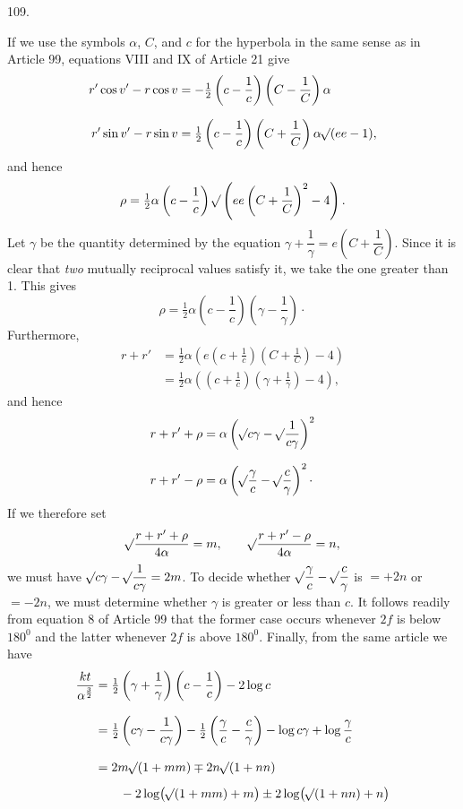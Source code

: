 \par{}\medskip
\hypertarget{native-151-article109}{}
\begin{center}109.\end{center}
If we use the symbols $\alpha$, $C$, and $c$ for the hyperbola in the same sense as in Article 99, equations VIII and IX of Article 21 give
\[
\begin{aligned}
r'\cos v'-r\cos v&=-\tfrac12\left(c-\frac1c\right)\left(C-\frac1C\right)\alpha\\[.7em]
r'\sin v'-r\sin v&=\tfrac12\left(c-\frac1c\right)\left(C+\frac1C\right)\alpha\mathord{{}^{}\!\surd}(ee-1),
\end{aligned}
\]
\noindent and hence
\[
\rho=\tfrac12\alpha\left(c-\frac1c\right)\mathord{{}^{}\!\surd}\left(ee\left(C+\frac1C\right)^2-4\right).
\]
\noindent{}Let $\gamma$ be the quantity determined by the equation $\gamma+\dfrac1\gamma=e\left(C+\dfrac1C\right)$. Since it is clear that \emph{two} mutually reciprocal values satisfy it, we take the one greater than 1. This gives
\[
\rho=\tfrac12\alpha\left(c-\frac1c\right)\left(\gamma-\frac1\gamma\right)\mathpunct{\cdot}
\]
\noindent Furthermore,
\[
\begin{aligned}
r+r'&=\tfrac12\alpha\left(e\left(c+\frac1c\right)\left(C+\frac1C\right)-4\right)\\[.7em]
&=\tfrac12\alpha\left(\left(c+\frac1c\right)\left(\gamma+\frac1\gamma\right)-4\right),
\end{aligned}
\]
\noindent and hence
\[
\begin{aligned}
r+r'+\rho&=\alpha\left(\mathord{{}^{}\!\surd}c\gamma-\mathord{{}^{}\!\surd}\frac1{c\gamma}\right)^2\\[.7em]
r+r'-\rho&=\alpha\left(\mathord{{}^{}\!\surd}\frac\gamma c-\mathord{{}^{}\!\surd}\frac c\gamma\right)^2\mathpunct{\cdot}
\end{aligned}
\]
\noindent If we therefore set
\[
\mathord{{}^{}\!\surd}\frac{r+r'+\rho}{4\alpha}=m,\qquad\mathord{{}^{}\!\surd}\frac{r+r'-\rho}{4\alpha}=n,
\]
\noindent we must have $\mathord{{}^{}\!\surd}c\gamma-\mathord{{}^{}\!\surd}\dfrac1{c\gamma}=2m$. To decide whether $\mathord{{}^{}\!\surd}\dfrac\gamma c-\mathord{{}^{}\!\surd}\dfrac c\gamma$ is $=+2n$ or $=-2n$, we must determine whether $\gamma$ is greater or less than $c$. It follows readily from equation 8 of Article 99 that the former case occurs whenever $2f$ is below $180^0$ and the latter whenever $2f$ is above $180^0$. Finally, from the same article we have
\[
\begin{aligned}
\frac{kt}{\alpha^{\frac32}}&=\tfrac12\left(\gamma+\frac1\gamma\right)\left(c-\frac1c\right)-2\log c\\[.8em]
&=\tfrac12\left(c\gamma-\frac1{c\gamma}\right)-\tfrac12\left(\frac\gamma c-\frac c\gamma\right)-\log c\gamma+\log\frac\gamma c\\[.8em]
&=2m\mathord{{}^{}\!\surd}(1+mm)\mp2n\mathord{{}^{}\!\surd}(1+nn)\\[.5em]
&\qquad-2\log\bigl(\mathord{{}^{}\!\surd}(1+mm)+m\bigr)\pm2\log\bigl(\mathord{{}^{}\!\surd}(1+nn)+n\bigr)
\end{aligned}
\]
